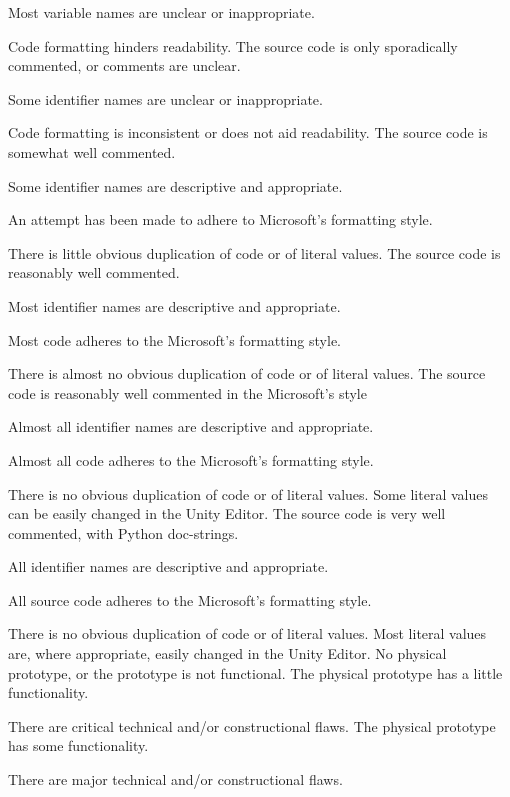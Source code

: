 \documentclass{../../fal_assignment}
\begin{document}
\begin{markingrubric}
	\par Most variable names are unclear or inappropriate.
	\par Code formatting hinders readability.
	\grade The source code is only sporadically commented, or comments are unclear.
	\par Some identifier names are unclear or inappropriate.
	\par Code formatting is inconsistent or does not aid readability.
	\grade The source code is somewhat well commented.
	\par Some identifier names are descriptive and appropriate.
	\par An attempt has been made to adhere to Microsoft's formatting style.
	\par There is little obvious duplication of code or of literal values.           
	\grade The source code is reasonably well commented.
	\par Most identifier names are descriptive and appropriate.
	\par Most code adheres to the Microsoft's formatting style.
	\par There is almost no obvious duplication of code or of literal values.   
	\grade The source code is reasonably well commented in the Microsoft's style
	\par Almost all identifier names are descriptive and appropriate.
	\par Almost all code adheres to the Microsoft's formatting style.
	\par There is no obvious duplication of code or of literal values. Some literal values can be easily changed in the Unity Editor.
	\grade The source code is very well commented, with Python doc-strings.
	\par All identifier names are descriptive and appropriate.
	\par All source code adheres to the Microsoft's formatting style.
	\par There is no obvious duplication of code or of literal values. Most literal values are, where appropriate, easily changed in the Unity Editor.  
	\grade\fail No physical prototype, or the prototype is not functional.
	\grade The physical prototype has a little functionality.
	\par There are critical technical and/or constructional flaws.
	\grade The physical prototype has some functionality.
	\par There are major technical and/or constructional flaws.

\end{markingrubric}
\end{document}
